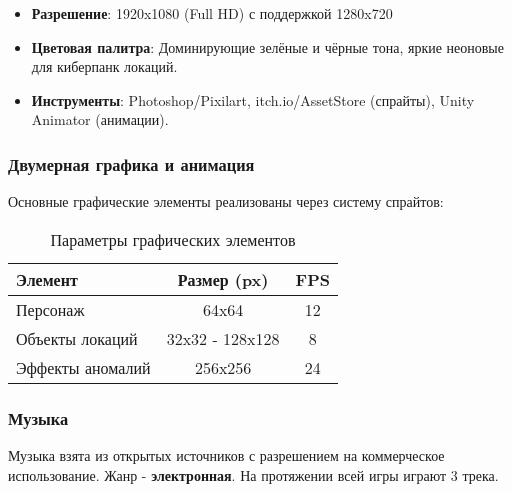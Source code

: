 \documentclass{article}
\begin{document}
\begin{itemize}
    \item \textbf{Разрешение}: 1920x1080 (Full HD) с поддержкой 1280x720
    \item \textbf{Цветовая палитра}: Доминирующие зелёные и чёрные тона, яркие неоновые для киберпанк локаций.
    \item \textbf{Инструменты}: Photoshop/Pixilart, itch.io/AssetStore  (спрайты), Unity Animator (анимации).
\end{itemize}
\subsubsection{Двумерная графика и анимация}
Основные графические элементы реализованы через систему спрайтов:

\begin{table}[h]
    \centering
    \begin{tabular}{|l|c|c|}
        \hline
        \textbf{Элемент} & \textbf{Размер (px)} & \textbf{FPS} \\ \hline
        Персонаж & 64x64 & 12 \\ \hline
        Объекты локаций & 32x32 - 128x128 & 8 \\ \hline
        Эффекты аномалий & 256x256 & 24 \\ \hline
    \end{tabular}
    \caption{Параметры графических элементов}
    \label{tab:gfx}
\end{table}

\subsubsection{Музыка}
Музыка взята из открытых источников с разрешением на коммерческое использование. Жанр - \textbf{электронная}. На протяжении всей игры играют 3 трека. 
\end{document}
